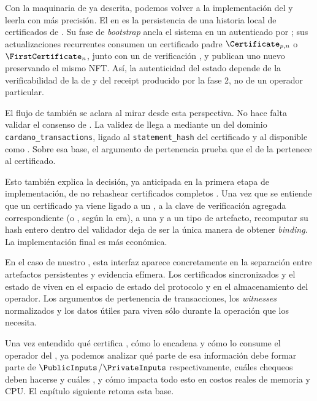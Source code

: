 
Con la maquinaria de \Mithril ya descrita, podemos volver a la implementación del \zkBridge y leerla con más precisión. El \StakeDistributionUTxO en \ChainB es la persistencia \Onchain de una historia local de certificados de \Mithril. Su fase de \textit{bootstrap} ancla el sistema en un \GenesisCertificate autenticado por \GenesisVerificationKey; sus actualizaciones recurrentes consumen un certificado padre $\Certificate_{p,n}$ o $\FirstCertificate_n$, junto con un \ProofReceipt de verificación \STM, y publican uno nuevo preservando el mismo NFT. Así, la autenticidad del estado depende de la verificabilidad de la \CertificateChain de \Mithril y del receipt producido por la fase 2, no de un operador particular.

El flujo de \MintTx también se aclara al mirar \Mithril desde esta perspectiva. No hace falta validar el consenso de \Cardano. La validez \STM de \TransactionSnapshotCertificate llega a \MintTx mediante un \ProofReceipt del dominio \texttt{cardano\_transactions}, ligado al \texttt{statement\_hash} del certificado y al \StakeDistributionUTxO disponible como \ReferenceInput. Sobre esa base, el argumento \Groth de pertenencia prueba que el \TxId de la \LockTx pertenece al \TransactionSnapshot certificado.

Esto también explica la decisión, ya anticipada en la primera etapa de implementación, de no rehashear certificados completos \Onchain. Una vez que se entiende que un certificado ya viene ligado a un \ProtocolMsg, a la clave de verificación agregada correspondiente (\AVK o \SnarkAVK, según la era), a una \CertificateChain y a un tipo de artefacto, recomputar su hash entero dentro del validador deja de ser la única manera de obtener \textit{binding}. La implementación final es más económica.

En el caso de nuestro \ZkBridgeOperator, esta interfaz aparece concretamente en la separación entre artefactos persistentes y evidencia efímera. Los certificados sincronizados y el estado de \StakeDistribution viven en el espacio de estado del protocolo y en el almacenamiento del operador. Los argumentos de pertenencia de transacciones, los \textit{witnesses} normalizados y los datos útiles para \Groth viven sólo durante la operación que los necesita.

Una vez entendido qué certifica \Mithril, cómo lo encadena y cómo lo consume el operador del \zkBridge, ya podemos analizar qué parte de esa información debe formar parte de $\PublicInputs$/$\PrivateInputs$ respectivamente, cuáles chequeos deben hacerse \Onchain y cuáles \Offchain, y cómo impacta todo esto en costos reales de memoria y CPU. El capítulo siguiente retoma esta base.
